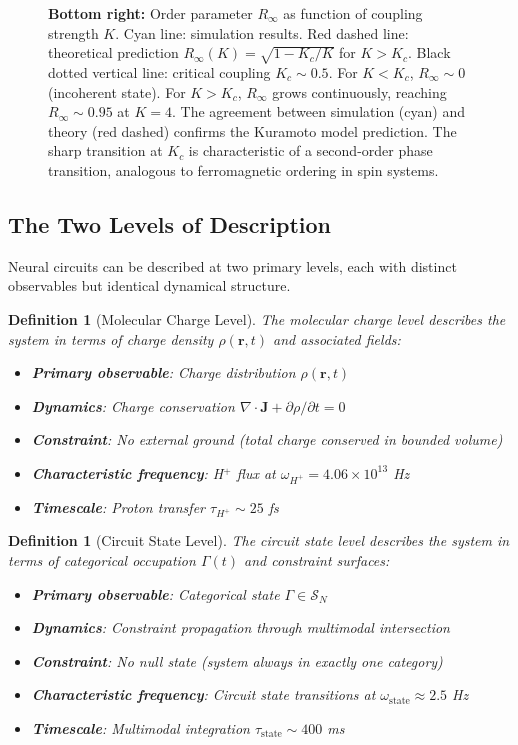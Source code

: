 \documentclass[aps,prd,twocolumn,superscriptaddress,floatfix,nofootinbib]{revtex4-2}
\newtheorem{definition}[theorem]{Definition}
\theoremstyle{remark}
\begin{document}
\begin{figure}[!htbp]
{\textbf{Bottom right:} Order parameter $R_\infty$ as function of coupling strength $K$. Cyan line: simulation results. Red dashed line: theoretical prediction $R_\infty(K) = \sqrt{1 - K_c/K}$ for $K > K_c$. Black dotted vertical line: critical coupling $K_c \sim 0.5$. For $K < K_c$, $R_\infty \sim 0$ (incoherent state). For $K > K_c$, $R_\infty$ grows continuously, reaching $R_\infty \sim 0.95$ at $K = 4$. The agreement between simulation (cyan) and theory (red dashed) confirms the Kuramoto model prediction. The sharp transition at $K_c$ is characteristic of a second-order phase transition, analogous to ferromagnetic ordering in spin systems.}
\label{fig:phase_coherence}
\end{figure}

\subsection{The Two Levels of Description}

Neural circuits can be described at two primary levels, each with distinct observables but identical dynamical structure.

\begin{definition}[Molecular Charge Level]
\label{def:charge_level}
The molecular charge level describes the system in terms of charge density $\rho(\mathbf{r}, t)$ and associated fields:
\begin{itemize}
\item \textbf{Primary observable}: Charge distribution $\rho(\mathbf{r}, t)$
\item \textbf{Dynamics}: Charge conservation $\nabla \cdot \mathbf{J} + \partial\rho/\partial t = 0$
\item \textbf{Constraint}: No external ground (total charge conserved in bounded volume)
\item \textbf{Characteristic frequency}: H$^+$ flux at $\omega_{H^+} = 4.06 \times 10^{13}$ Hz
\item \textbf{Timescale}: Proton transfer $\tau_{H^+} \sim 25$ fs
\end{itemize}
\end{definition}

\begin{definition}[Circuit State Level]
\label{def:circuit_level}
The circuit state level describes the system in terms of categorical occupation $\Gamma(t)$ and constraint surfaces:
\begin{itemize}
\item \textbf{Primary observable}: Categorical state $\Gamma \in \mathcal{S}_N$
\item \textbf{Dynamics}: Constraint propagation through multimodal intersection
\item \textbf{Constraint}: No null state (system always in exactly one category)
\item \textbf{Characteristic frequency}: Circuit state transitions at $\omega_{\text{state}} \approx 2.5$ Hz
\item \textbf{Timescale}: Multimodal integration $\tau_{\text{state}} \sim 400$ ms
\end{itemize}
\end{definition}
\end{document}
